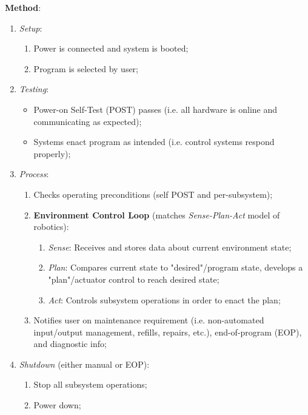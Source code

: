 \textbf{Method}:
\begin{enumerate}
    \item \textit{Setup}:
    \begin{enumerate}
        \item Power is connected and system is booted;
        \item Program is selected by user;
    \end{enumerate}
    \item \textit{Testing}:
    \begin{itemize}
        \item Power-on Self-Test (POST) passes (i.e. all hardware is online and communicating as expected);
        \item Systems enact program as intended (i.e. control systems respond properly);
    \end{itemize}
    \item \textit{Process}:
    \begin{enumerate}
        \item Checks operating preconditions (self POST and per-subsystem);
        \item \textbf{Environment Control Loop} (matches \textit{Sense-Plan-Act} model of robotics): %
        \begin{enumerate}
            \item \textit{Sense}: Receives and stores data about current environment state;
            \item \textit{Plan}: Compares current state to "desired"/program state, develops a "plan"/actuator control to reach desired state;
            \item \textit{Act}: Controls subsystem operations in order to enact the plan;
        \end{enumerate}
        \item Notifies user on maintenance requirement (i.e. non-automated input/output management, refills, repairs, etc.), end-of-program (EOP), and diagnostic info;
    \end{enumerate}
    \item \textit{Shutdown} (either manual or EOP):
    \begin{enumerate}
        \item Stop all subsystem operations;
        \item Power down;
    \end{enumerate}
\end{enumerate}

